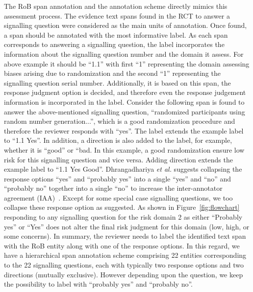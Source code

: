 \documentclass[sn-mathphys,Numbered]{sn-jnl}%
\theoremstyle{thmstyleone}%
\theoremstyle{thmstyletwo}%
\theoremstyle{thmstylethree}%
\begin{document}
The RoB span annotation and the annotation scheme directly mimics this assessment process.
The evidence text spans found in the RCT to answer a signalling question were considered as the main units of annotation.
Once found, a span should be annotated with the most informative label.
As each span corresponds to answering a signalling question, the label incorporates the information about the signalling question number and the domain it assess.
For above example it should be ``1.1'' with first ``1'' representing the domain assessing biases arising due to randomization and the second ``1'' representing the signalling question serial number.
Additionally, it is based on this span, the response judgment option is decided, and therefore even the response judgement information is incorporated in the label.
Consider the following span is found to answer the above-mentioned signalling question, ``randomized participants using random number generation...'', which is a good randomization procedure and therefore the reviewer responds with ``yes''.
The label extends the example label to ``1.1 Yes''.
In addition, a direction is also added to the label, for example, whether it is ``good'' or ``bad.
In this example, a good randomization ensure low risk for this signalling question and vice versa.
Adding direction extends the example label to ``1.1 Yes Good''.
Dhrangadhariya \textit{et al.} suggests collapsing the response options ``yes'' and ``probably yes'' into a single ``yes'' and ``no'' and ``probably no'' together into a single ``no'' to increase the inter-annotator agreement (IAA)~\cite{dhrangadhariya2023first}.
Except for some special case signalling questions, we too collapse these response option as suggested.
As shown in Figure~\ref{fig:flowchart} responding to any signalling question for the risk domain 2 as either ``Probably yes'' or ``Yes'' does not alter the final risk judgment for this domain (low, high, or some concerns).
In summary, the reviewer needs to label the identified text span with the RoB entity along with one of the response options.
In this regard, we have a hierarchical span annotation scheme comprising 22 entities corresponding to the 22 signalling questions, each with typically two response options and two directions (mutually exclusive).
However depending upon the question, we keep the possibility to label with ``probably yes'' and ``probably no''.
\end{document}
